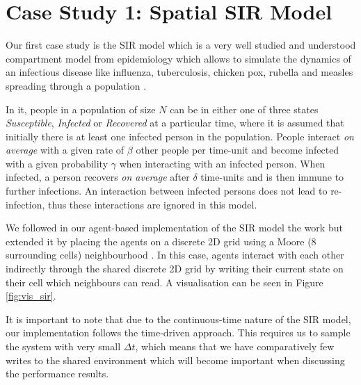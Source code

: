 \section{Case Study 1: Spatial SIR Model} %
\label{sec:cs_sir}

Our first case study is the SIR model which is a very well studied and understood compartment model from epidemiology \cite{kermack_contribution_1927} which allows to simulate the dynamics of an infectious disease like influenza, tuberculosis, chicken pox, rubella and measles spreading through a population \cite{enns_its_2010}.

In it, people in a population of size $N$ can be in either one of three states \textit{Susceptible}, \textit{Infected} or \textit{Recovered} at a particular time, where it is assumed that initially there is at least one infected person in the population. People interact \textit{on average} with a given rate of $\beta$ other people per time-unit and become infected with a given probability $\gamma$ when interacting with an infected person. When infected, a person recovers \textit{on average} after $\delta$ time-units and is then immune to further infections. An interaction between infected persons does not lead to re-infection, thus these interactions are ignored in this model. 

We followed in our agent-based implementation of the SIR model the work \cite{macal_agent-based_2010} but extended it by placing the agents on a discrete 2D grid using a Moore (8 surrounding cells) neighbourhood \cite{thaler_pure_2019}. In this case, agents interact with each other indirectly through the shared discrete 2D grid by writing their current state on their cell which neighbours can read. A visualisation can be seen in Figure \ref{fig:vis_sir}.

It is important to note that due to the continuous-time nature of the SIR model, our implementation follows the time-driven \cite{meyer_event-driven_2014} approach. This requires us to sample the system with very small $\Delta t$, which means that we have comparatively few writes to the shared environment which will become important when discussing the performance results.

